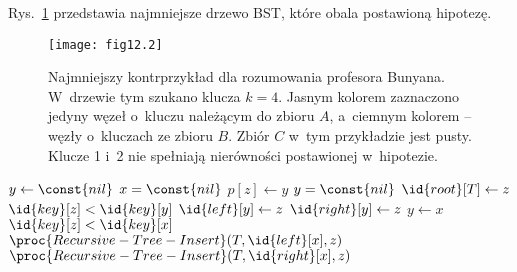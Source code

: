 \exercise %
Rys.~\ref{fig:12.2-4} przedstawia najmniejsze drzewo BST, które obala postawioną hipotezę.
\begin{figure}[ht]
	\begin{center}
		\texttt{[image: fig12.2]}
	\end{center}
	\caption{Najmniejszy kontrprzykład dla rozumowania profesora Bunyana. W~drzewie tym szukano klucza $k=4$. Jasnym kolorem zaznaczono jedyny węzeł o~kluczu należącym do zbioru $A$, a~ciemnym kolorem -- węzły o~kluczach ze zbioru $B$. Zbiór $C$ w~tym przykładzie jest pusty. Klucze 1 i~2 nie spełniają nierówności postawionej w~hipotezie.} \label{fig:12.2-4}
\end{figure}

\exercise %
\exercise %
\exercise %
\exercise %
\exercise %


\exercise %
\begin{codebox}
\li	$y\gets\const{nil}$
\li	\If $x=\const{nil}$
\li		\Then
			$p[z]\gets y$
\li			\If $y=\const{nil}$
\li				\Then $\id{root}[T]\gets z$
\li				\Else
					\If $\id{key}[z]<\id{key}[y]$
\li						\Then $\id{left}[y]\gets z$
\li						\Else $\id{right}[y]\gets z$
						\End
				\End
\li		\Else
			$y\gets x$
\li			\If $\id{key}[z]<\id{key}[x]$
\li				\Then $\proc{Recursive-Tree-Insert}(T,\id{left}[x],z)$
\li				\Else $\proc{Recursive-Tree-Insert}(T,\id{right}[x],z)$
				\End
		\End
\end{codebox}

\exercise %
\exercise %
\exercise %
\exercise %
\exercise %


\exercise %
\exercise %
\exercise %
\exercise %
\exercise %

\problems


\subproblem %
\subproblem %
\subproblem %
\subproblem %



\subproblem %
\subproblem %
\subproblem %
\subproblem %
\subproblem %
\subproblem %


\subproblem %
\subproblem %
\subproblem %
\subproblem %

\endinput